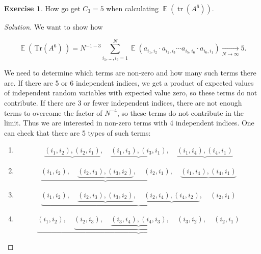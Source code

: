 \documentclass[letterpaper,11pt,oneside,reqno]{amsart}
\numberwithin{equation}{section}
\DeclareMathOperator{\EE}{\mathbb{E}}
\theoremstyle{definition}
\newtheorem{exercise}[proposition]{Exercise}
\begin{document}
\begin{exercise}
How go get $ C_3 = 5 $ when calculating $ \EE(\mathop{\mathrm{tr}}( A^6 ) )$.
\end{exercise}
\begin{proof}[Solution]
	We want to show how

	\begin{equation*}
	\EE( \, \text{Tr}( A^6 ) \, ) = N^{ -1 - 3 } \sum_{ i_1 , \ldots, i_6 = 1 }^N \EE \left( a_{ i_1, i_2 } \cdot a_{ i_2, i_3 } \cdots a_{ i_5, i_6 } \cdot a_{ i_6, i_1 } \right) \xrightarrow[ N \to \infty ]{} 5.
	\end{equation*}

	We need to determine which terms are non-zero and how many such terms there are.  If there are 5 or 6 independent indices, we get a product of expected values of independent random variables with expected value zero, so these terms do not contribute.  If there are 3 or fewer independent indices, there are not enough terms to overcome the factor of $ N^{ -4 } $, so these terms do not contribute in the limit.  Thus we are interested in non-zero terms with 4 independent indices.
	One can check that there are 5 types of such terms:

	\begin{enumerate}

	\item
	\begin{equation*}
	\underbrace{ ( i_1, i_2 ) , ( i_2 , i_1 ) }, \quad \underbrace{ ( i_1, i_3 ) , ( i_3, i_1 ) }, \quad \underbrace{ ( i_1, i_4 ), ( i_4, i_1 ) }
	\end{equation*}

	\item
	\begin{equation*}
	\underbrace{ ( i_1, i_2 ) , \quad \underbrace{ ( i_2 , i_3 ) , ( i_3, i_2 ) } , \quad ( i_2, i_1 ) } , \quad \underbrace{ ( i_1, i_4 ), ( i_4, i_1 ) }
	\end{equation*}

	\item
	\begin{equation*}
	\underbrace{ ( i_1, i_2 ) , \quad \underbrace{ ( i_2 , i_3 ) , ( i_3, i_2 ) } , \quad \underbrace{ ( i_2, i_4 ) , ( i_4, i_2 ) }, \quad ( i_2, i_1 ) } 
	\end{equation*}

	\item
	\begin{equation*}
	\underbrace{ ( i_1, i_2 ) , \quad \underbrace{ ( i_2 , i_3 ) , \quad \underbrace{ ( i_3, i_4 ) , ( i_4, i_3 ) }, \quad ( i_3, i_2 ) } , \quad ( i_2, i_1 ) } 
	\end{equation*}


\end{enumerate}
\end{proof}
\end{document}
